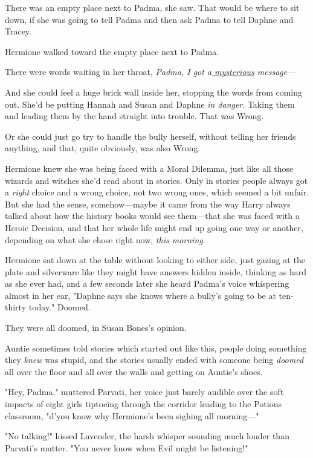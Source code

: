 There was an empty place next to Padma, she saw. That would be where to sit 
down, if she was going to tell Padma and then ask Padma to tell Daphne and 
Tracey.

Hermione walked toward the empty place next to Padma.

There were words waiting in her throat, \emph{Padma, I got a\underline{ 
mysterious} message---}

And she could feel a huge brick wall inside her, stopping the words from coming 
out. She'd be putting Hannah and Susan and Daphne \emph{in danger}. Taking them 
and leading them by the hand straight into trouble. That was Wrong.

Or she could just go try to handle the bully herself, without telling her 
friends anything, and that, quite obviously, was also Wrong.

Hermione knew she was being faced with a Moral Dilemma, just like all those 
wizards and witches she'd read about in stories. Only in stories people always 
got a \emph{right} choice and a wrong choice, not two wrong ones, which seemed 
a bit unfair. But she had the sense, somehow---maybe it came from the way Harry 
always talked about how the history books would see them---that she was faced 
with a Heroic Decision, and that her whole life might end up going one way or 
another, depending on what she chose right now, \emph{this morning}.

Hermione sat down at the table without looking to either side, just gazing at 
the plate and silverware like they might have answers hidden inside, thinking 
as hard as she ever had, and a few seconds later she heard Padma's voice 
whispering almost in her ear, "Daphne says she knows where a bully's going to 
be at ten-thirty today."
\sbreak
Doomed.

They were all doomed, in Susan Bones's opinion.

Auntie sometimes told stories which started out like this, people doing 
something they \emph{knew} was stupid, and the stories usually ended with 
someone being \emph{doomed} all over the floor and all over the walls and 
getting on Auntie's shoes.

"Hey, Padma," muttered Parvati, her voice just barely audible over the soft 
impacts of eight girls tiptoeing through the corridor leading to the Potions 
classroom, "d'you know why Hermione's been sighing all morning---"

"No talking!" hissed Lavender, the harsh whisper sounding much louder than 
Parvati's mutter. "You never know when Evil might be listening!"

